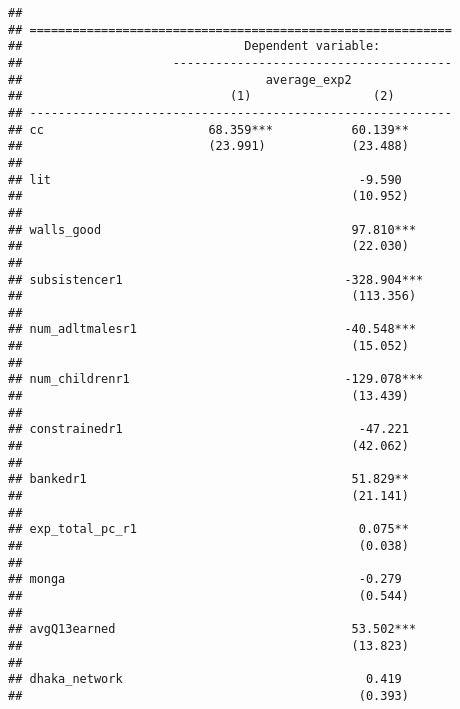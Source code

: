 \documentclass[
]{article}
\begin{document}
\begin{verbatim}
## 
## ===========================================================
##                               Dependent variable:          
##                     ---------------------------------------
##                                  average_exp2              
##                             (1)                 (2)        
## -----------------------------------------------------------
## cc                       68.359***           60.139**      
##                          (23.991)            (23.488)      
##                                                            
## lit                                           -9.590       
##                                              (10.952)      
##                                                            
## walls_good                                   97.810***     
##                                              (22.030)      
##                                                            
## subsistencer1                               -328.904***    
##                                              (113.356)     
##                                                            
## num_adltmalesr1                             -40.548***     
##                                              (15.052)      
##                                                            
## num_childrenr1                              -129.078***    
##                                              (13.439)      
##                                                            
## constrainedr1                                 -47.221      
##                                              (42.062)      
##                                                            
## bankedr1                                     51.829**      
##                                              (21.141)      
##                                                            
## exp_total_pc_r1                               0.075**      
##                                               (0.038)      
##                                                            
## monga                                         -0.279       
##                                               (0.544)      
##                                                            
## avgQ13earned                                 53.502***     
##                                              (13.823)      
##                                                            
## dhaka_network                                  0.419       
##                                               (0.393)      

\end{verbatim}
\end{document}
